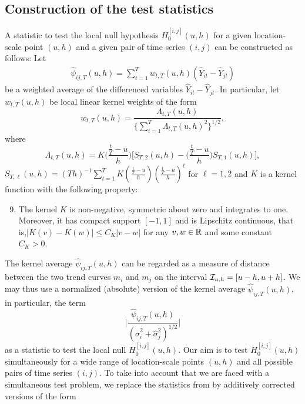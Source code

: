 \documentclass[12pt]{article}
\makeatletter
\renewcommand{\eqref}[1]{\tagform@{\ref{#1}}}
\makeatother
\begin{document}
\subsection{Construction of the test statistics}\label{subsec:test:stat}


A statistic to test the local null hypothesis $H_0^{[i, j]}(u, h)$ for a given location-scale point $(u,h)$ and a given pair of time series $(i,j)$ can be constructed as follows: Let
\begin{align}\label{eq:psi_hat_ij}
\widehat{\psi}_{ij, T}(u, h) = \sum\limits_{t=1}^T w_{t,T}(u, h)(\widehat{Y}_{it} - \widehat{Y}_{jt})
\end{align}
be a weighted average of the differenced variables $\widehat{Y}_{it} - \widehat{Y}_{jt}$. In particular, let $w_{t,T}(u, h)$ be local linear kernel weights of the form
\begin{equation}\label{eq:weights}
w_{t,T}(u, h) = \frac{\Lambda_{t,T}(u, h)}{ \{\sum\nolimits_{t=1}^T \Lambda_{t,T}(u, h)^2 \}^{1/2} }, 
\end{equation}
where
\[ \Lambda_{t,T}(u, h) = K\Big(\frac{\frac{t}{T}-u}{h}\Big) \Big[ S_{T,2}(u, h) - \Big(\frac{\frac{t}{T}-u}{h}\Big) S_{T,1}(u, h) \Big], \]
$S_{T,\ell}(u, h) = (Th)^{-1} \sum\nolimits_{t=1}^T K(\frac{\frac{t}{T}-u}{h}) (\frac{\frac{t}{T}-u}{h})^\ell$ for $\ell = 1,2$ and $K$ is a kernel function with the following property: 
\begin{enumerate}[label=(C\arabic*),leftmargin=1.05cm]
\setcounter{enumi}{8}
\item \label{C-ker} The kernel $K$ is non-negative, symmetric about zero and integrates to one. Moreover, it has compact support $[-1,1]$ and is Lipschitz continuous, that is,\linebreak $|K(v) - K(w)| \le C_K |v-w|$ for any $v, w \in \mathbb{R}$ and some constant $C_K > 0$.
\end{enumerate} 
The kernel average $\widehat{\psi}_{ij, T}(u, h)$ can be regarded as a measure of distance between the two trend curves $m_i$ and $m_j$ on the interval $\mathcal{I}_{u, h} = [u-h, u+h]$. We may thus use a normalized (absolute) version of the kernel average $\widehat{\psi}_{ij, T}(u, h)$, in particular, the term 
\begin{equation}\label{eq:local-stat-without-correction}
\Big| \frac{\widehat{\psi}_{ij, T}(u, h)}{(\widehat{\sigma}_i^2 + \widehat{\sigma}_j^2)^{1/2}} \Big|
\end{equation}
as a statistic to test the local null $H_0^{[i, j]}(u, h)$. Our aim is to test $H_0^{[i, j]}(u, h)$ simultaneously for a wide range of location-scale points $(u,h)$ and all possible pairs of time series $(i,j)$. To take into account that we are faced with a simultaneous test problem, we replace the statistics from \eqref{eq:local-stat-without-correction} by additively corrected versions of the form 
\end{document}
